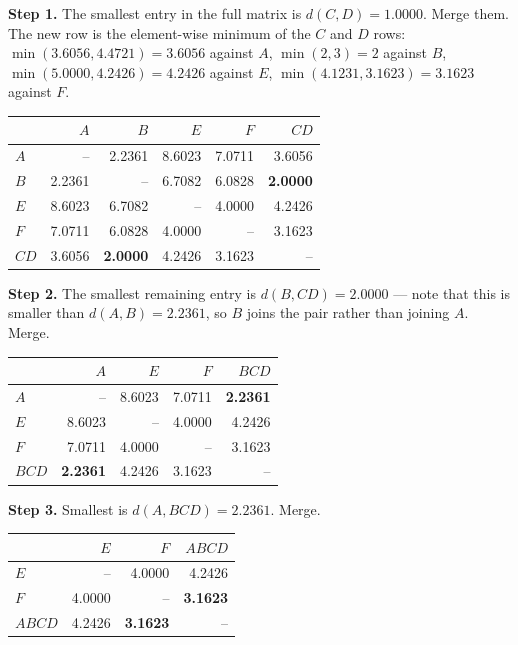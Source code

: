 \documentclass[11pt]{article}
\begin{document}
\begin{worked}
\textbf{Step 1.} The smallest entry in the full matrix is $d(C,D) = 1.0000$.
Merge them. The new row is the element-wise minimum of the $C$ and $D$ rows:
$\min(3.6056, 4.4721) = 3.6056$ against $A$, $\min(2, 3) = 2$ against $B$,
$\min(5.0000, 4.2426) = 4.2426$ against $E$, $\min(4.1231, 3.1623) = 3.1623$
against $F$.
\begin{center}\small
\begin{tabular}{lrrrrr}
  \toprule
  & $A$ & $B$ & $E$ & $F$ & $CD$ \\
  \midrule
  $A$  & --     & 2.2361 & 8.6023 & 7.0711 & 3.6056 \\
  $B$  & 2.2361 & --     & 6.7082 & 6.0828 & \textbf{2.0000} \\
  $E$  & 8.6023 & 6.7082 & --     & 4.0000 & 4.2426 \\
  $F$  & 7.0711 & 6.0828 & 4.0000 & --     & 3.1623 \\
  $CD$ & 3.6056 & \textbf{2.0000} & 4.2426 & 3.1623 & --  \\
  \bottomrule
\end{tabular}
\end{center}

\textbf{Step 2.} The smallest remaining entry is $d(B, CD) = 2.0000$ --- note
that this is smaller than $d(A,B) = 2.2361$, so $B$ joins the pair rather than
joining $A$. Merge.
\begin{center}\small
\begin{tabular}{lrrrr}
  \toprule
  & $A$ & $E$ & $F$ & $BCD$ \\
  \midrule
  $A$   & --     & 8.6023 & 7.0711 & \textbf{2.2361} \\
  $E$   & 8.6023 & --     & 4.0000 & 4.2426 \\
  $F$   & 7.0711 & 4.0000 & --     & 3.1623 \\
  $BCD$ & \textbf{2.2361} & 4.2426 & 3.1623 & -- \\
  \bottomrule
\end{tabular}
\end{center}

\textbf{Step 3.} Smallest is $d(A, BCD) = 2.2361$. Merge.
\begin{center}\small
\begin{tabular}{lrrr}
  \toprule
  & $E$ & $F$ & $ABCD$ \\
  \midrule
  $E$    & --     & 4.0000 & 4.2426 \\
  $F$    & 4.0000 & --     & \textbf{3.1623} \\
  $ABCD$ & 4.2426 & \textbf{3.1623} & -- \\
  \bottomrule
\end{tabular}
\end{center}


\end{worked}
\end{document}

